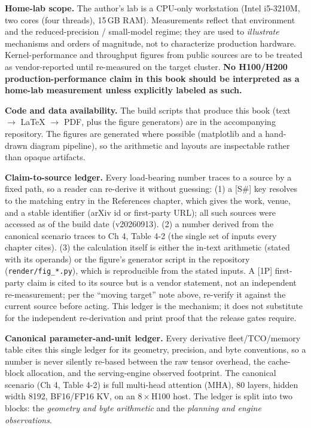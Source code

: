 \noindent\textbf{Home-lab scope.} The author's lab is a CPU-only workstation (Intel i5-3210M, two cores (four threads), 15\,GB RAM). Measurements reflect that environment and the reduced-precision / small-model regime; they are used to \emph{illustrate} mechanisms and orders of magnitude, not to characterize production hardware. Kernel-performance and throughput figures from public sources are to be treated as vendor-reported until re-measured on the target cluster. \textbf{No H100/H200 production-performance claim in this book should be interpreted as a home-lab measurement unless explicitly labeled as such.}

\noindent\textbf{Code and data availability.} The build scripts that produce this book (text $\to$ LaTeX $\to$ PDF, plus the figure generators) are in the accompanying repository. The figures are generated where possible (matplotlib and a hand-drawn diagram pipeline), so the arithmetic and layouts are inspectable rather than opaque artifacts.

\noindent\textbf{Claim-to-source ledger.} Every load-bearing number traces to a source by a fixed path, so a reader can re-derive it without guessing: (1) a \textsc{[S\#]} key resolves to the matching entry in the References chapter, which gives the work, venue, and a stable identifier (arXiv id or first-party URL); all such sources were accessed as of the build date (v20260913). (2) a number derived from the canonical scenario traces to Ch 4, Table 4-2 (the single set of inputs every chapter cites). (3) the calculation itself is either the in-text arithmetic (stated with its operands) or the figure's generator script in the repository (\texttt{render/fig\_*.py}), which is reproducible from the stated inputs. A \textsc{[1P]} first-party claim is cited to its source but is a vendor statement, not an independent re-measurement; per the ``moving target'' note above, re-verify it against the current source before acting. This ledger is the mechanism; it does not substitute for the independent re-derivation and print proof that the release gates require.

\noindent\textbf{Canonical parameter-and-unit ledger.} Every derivative fleet/TCO/memory table cites this single ledger for its geometry, precision, and byte conventions, so a number is never silently re-based between the raw tensor overhead, the cache-block allocation, and the serving-engine observed footprint. The canonical scenario (Ch 4, Table 4-2) is full multi-head attention (MHA), 80 layers, hidden width 8192, BF16/FP16 KV, on an 8\,$\times$\,H100 host. The ledger is split into two blocks: the \emph{geometry and byte arithmetic} and the \emph{planning and engine observations}.

